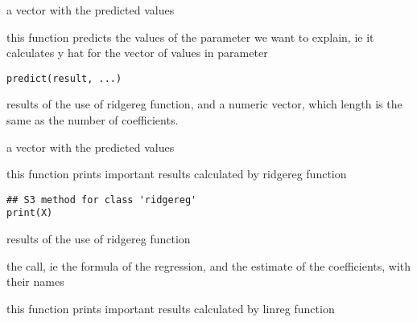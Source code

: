 \documentclass[a4paper]{book}
\begin{document}
%
\begin{Value}
a vector with the predicted values
\end{Value}
%
\begin{Description}\relax
this function predicts the values of the parameter we want to explain,
ie it calculates y hat for the vector of values in parameter
\end{Description}
%
\begin{Usage}
\begin{verbatim}
predict(result, ...)
\end{verbatim}
\end{Usage}
%
\begin{Arguments}
\begin{ldescription}
\item[\code{what}] results of the use of ridgereg function, and a numeric vector, which length is the
same as the number of coefficients.
\end{ldescription}
\end{Arguments}
%
\begin{Value}
a vector with the predicted values
\end{Value}
%
\begin{Description}\relax
this function prints important results calculated by ridgereg function
\end{Description}
%
\begin{Usage}
\begin{verbatim}
## S3 method for class 'ridgereg'
print(X)
\end{verbatim}
\end{Usage}
%
\begin{Arguments}
\begin{ldescription}
\item[\code{what}] results of the use of ridgereg function
\end{ldescription}
\end{Arguments}
%
\begin{Value}
the call, ie the formula of the regression, and the estimate of the coefficients,
with their names
\end{Value}
%
\begin{Description}\relax
this function prints important results calculated by linreg function
\end{Description}
\end{document}
